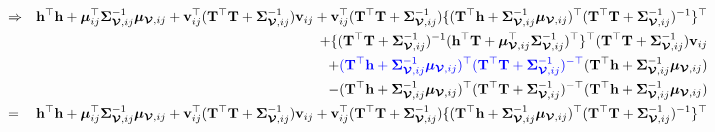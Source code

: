 \documentclass[12pt]{article}
\newcommand{\0}{\mathbf{0}}
\begin{document}
\begin{eqnarray*}
& \Rightarrow & \mathbf{h}^{\top} \mathbf{h} + \boldsymbol{\mu}_{ij}^{\top} \boldsymbol{\Sigma}_{\boldsymbol{\mathcal{V}}, ij}^{-1} \boldsymbol{\mu}_{\boldsymbol{\mathcal{V}}, ij} + \mathbf{v}_{ij}^{\top} ( \mathbf{T}^{\top} \mathbf{T} + \boldsymbol{\Sigma}_{\boldsymbol{\mathcal{V}}, ij}^{-1} ) \mathbf{v}_{ij} + \mathbf{v}_{ij}^{\top} ( \mathbf{T}^{\top} \mathbf{T} + \boldsymbol{\Sigma}_{\boldsymbol{\mathcal{V}}, ij}^{-1} ) \{ ( \mathbf{T}^{\top} \mathbf{h} + \boldsymbol{\Sigma}_{\boldsymbol{\mathcal{V}}, ij}^{-1}\boldsymbol{\mu}_{\boldsymbol{\mathcal{V}}, ij} )^{\top} ( \mathbf{T}^{\top} \mathbf{T} + \boldsymbol{\Sigma}_{\boldsymbol{\mathcal{V}}, ij}^{-1} )^{-1} \}^{\top} \\
&& + \{ ( \mathbf{T}^{\top} \mathbf{T} + \boldsymbol{\Sigma}_{\boldsymbol{\mathcal{V}}, ij}^{-1} )^{-1} ( \mathbf{h}^{\top} \mathbf{T} + \boldsymbol{\mu}_{\boldsymbol{\mathcal{V}}, ij}^{\top} \boldsymbol{\Sigma}_{\boldsymbol{\mathcal{V}}, ij}^{-1})^{\top} \}^{\top} ( \mathbf{T}^{\top} \mathbf{T} + \boldsymbol{\Sigma}_{\boldsymbol{\mathcal{V}}, ij}^{-1} ) \mathbf{v}_{ij} \\
&& + \textcolor{blue}{( \mathbf{T}^{\top} \mathbf{h} + \boldsymbol{\Sigma}_{\boldsymbol{\mathcal{V}}, ij}^{-1}\boldsymbol{\mu}_{\boldsymbol{\mathcal{V}}, ij} )^{\top} ( \mathbf{T}^{\top} \mathbf{T} + \boldsymbol{\Sigma}_{\boldsymbol{\mathcal{V}}, ij}^{-1} )^{-\top} } ( \mathbf{T}^{\top} \mathbf{h} + \boldsymbol{\Sigma}_{\boldsymbol{\mathcal{V}}, ij}^{-1}\boldsymbol{\mu}_{\boldsymbol{\mathcal{V}}, ij} ) \\
&&- ( \mathbf{T}^{\top} \mathbf{h} + \boldsymbol{\Sigma}_{\boldsymbol{\mathcal{V}}, ij}^{-1}\boldsymbol{\mu}_{\boldsymbol{\mathcal{V}}, ij} )^{\top} ( \mathbf{T}^{\top} \mathbf{T} + \boldsymbol{\Sigma}_{\boldsymbol{\mathcal{V}}, ij}^{-1} )^{-\top}  ( \mathbf{T}^{\top} \mathbf{h} + \boldsymbol{\Sigma}_{\boldsymbol{\mathcal{V}}, ij}^{-1}\boldsymbol{\mu}_{\boldsymbol{\mathcal{V}}, ij} ) \\
& = & \mathbf{h}^{\top} \mathbf{h} + \boldsymbol{\mu}_{ij}^{\top} \boldsymbol{\Sigma}_{\boldsymbol{\mathcal{V}}, ij}^{-1} \boldsymbol{\mu}_{\boldsymbol{\mathcal{V}}, ij} + \mathbf{v}_{ij}^{\top} ( \mathbf{T}^{\top} \mathbf{T} + \boldsymbol{\Sigma}_{\boldsymbol{\mathcal{V}}, ij}^{-1} ) \mathbf{v}_{ij} + \mathbf{v}_{ij}^{\top} ( \mathbf{T}^{\top} \mathbf{T} + \boldsymbol{\Sigma}_{\boldsymbol{\mathcal{V}}, ij}^{-1} ) \{ ( \mathbf{T}^{\top} \mathbf{h} + \boldsymbol{\Sigma}_{\boldsymbol{\mathcal{V}}, ij}^{-1}\boldsymbol{\mu}_{\boldsymbol{\mathcal{V}}, ij} )^{\top} ( \mathbf{T}^{\top} \mathbf{T} + \boldsymbol{\Sigma}_{\boldsymbol{\mathcal{V}}, ij}^{-1} )^{-1} \}^{\top} \\

\end{eqnarray*}
\end{document}
